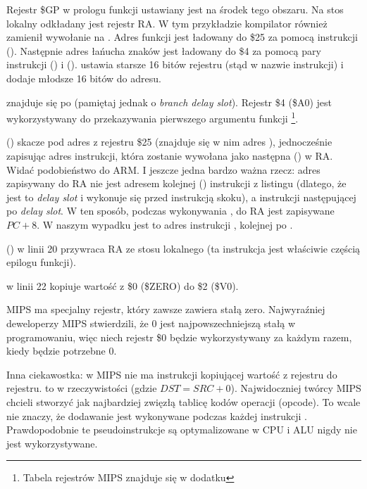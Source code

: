 

Rejestr \$GP w prologu funkcji ustawiany jest na środek tego obszaru.
Na stos lokalny odkładany jest rejestr \ac{RA}.
W tym przykładzie kompilator również zamienił wywołanie \printf na \puts.
Adres funkcji \puts jest ładowany do \$25 za pomocą instrukcji  ().
Następnie adres łańucha znaków jest ładowany do \$4 za pomocą pary instrukcji  () i
 ().
 ustawia starsze 16 bitów rejestru (stąd  w nazwie instrukcji) i 
dodaje młodsze 16 bitów do adresu.

 znajduje się po  (pamiętaj jednak o \emph{branch delay slot}).
Rejestr \$4 (\$A0) jest wykorzystywany do przekazywania pierwszego argumentu funkcji
\footnote{Tabela rejestrów MIPS znajduje się w dodatku }.


 () skacze pod adres z rejestru \$25 (znajduje się w nim adres \puts),
jednocześnie zapisując adres instrukcji, która zostanie wywołana jako następna () w \ac{RA}.
Widać podobieństwo do ARM.
I jeszcze jedna bardzo ważna rzecz: adres zapisywany do \ac{RA} nie jest adresem kolejnej () instrukcji z listingu (dlatego, że jest to
\emph{delay slot} i wykonuje się przed instrukcją skoku),
a instrukcji następującej po \emph{delay slot}.
W ten sposób, podczas wykonywania , do \ac{RA} jest zapisywane $PC + 8$.
W naszym wypadku jest to adres instrukcji , kolejnej po .

 () w linii 20 przywraca \ac{RA} ze stosu lokalnego (ta instrukcja jest właściwie częścią epilogu funkcji).

 w linii 22 kopiuje wartość z \$0 (\$ZERO) do \$2 (\$V0).

\label{MIPS_zero_register}
MIPS ma specjalny rejestr, który zawsze zawiera stałą zero.
Najwyraźniej deweloperzy MIPS stwierdzili, że 0 jest najpowszechniejszą stałą w programowaniu, więc niech rejestr \$0 będzie wykorzystywany za każdym razem, kiedy będzie potrzebne 0.

Inna ciekawostka: w MIPS nie ma instrukcji kopiującej wartość z rejestru do rejestru.
 to w rzeczywistości  (gdzie $DST=SRC+0$).
Najwidoczniej twórcy MIPS chcieli stworzyć jak najbardziej zwięzłą tablicę kodów operacji (opcode).
To wcale nie znaczy, że dodawanie jest wykonywane podczas każdej instrukcji .
Prawdopodobnie te pseudoinstrukcje są optymalizowane w \ac{CPU} i \ac{ALU} nigdy nie jest wykorzystywane.

